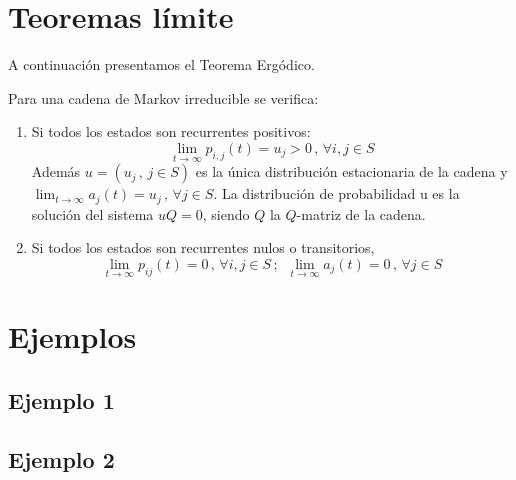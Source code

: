 \documentclass[12pt,a4paper]{article}
\begin{document}
\section{Teoremas límite}
A continuación presentamos el Teorema Ergódico.
\begin{theorem}
Para una cadena de Markov irreducible se verifica:
\begin{enumerate}
\item Si todos los estados son recurrentes positivos:
$$\lim_{t\rightarrow\infty}p_{i,j}(t)=u_j>0 \, , \, \forall i,j\in S$$
Además $u=(u_j \, , \, j\in S)$ es la única distribución estacionaria de la cadena y $\displaystyle\lim_{t\rightarrow\infty}a_j (t)=u_j \, , \, \forall j\in S$. La distribución de probabilidad u es la solución del sistema $uQ=0$, siendo $Q$ la $Q$-matriz de la cadena.
\item Si todos los estados son recurrentes nulos o transitorios,
$$\lim_{t\rightarrow\infty}p_{ij}(t)=0\, , \, \forall i,j \in S\, ;\,\,\, \lim_{t\rightarrow\infty}a_j (t)=0\, , \, \forall j\in S$$
\end{enumerate}
\end{theorem}
\section{Ejemplos}
\subsection{Ejemplo 1}
\subsection{Ejemplo 2}
\end{document}
